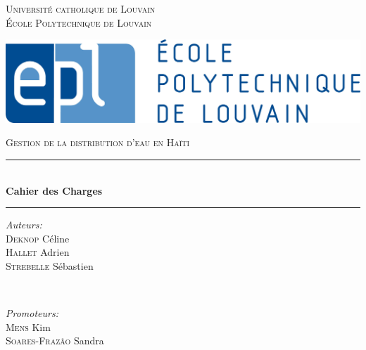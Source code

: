 \documentclass[a4paper, 11pt]{article}
\begin{document}
\begin{titlepage}

\newcommand{\HRule}{\rule{\linewidth}{0.5mm}} %

\center %

\textsc{\LARGE Université catholique de Louvain \\ École Polytechnique de Louvain}

\vfill

\includegraphics[scale=0.45]{Cahier_des_Charges/epl.jpg}

\vfill

\textsc{\large Gestion de la distribution d'eau en Haïti}\\[0.5cm] %


\HRule \\[0.5cm]
{ \huge \bfseries Cahier des Charges}\\[0.3cm] %
\HRule

\vfill


\begin{minipage}[t]{0.4\textwidth}
\begin{flushleft} \large
\emph{Auteurs:}\\
\textsc{Deknop} Céline \\
\textsc{Hallet} Adrien \\
\textsc{Strebelle} Sébastien \\
\end{flushleft}
\end{minipage}
~
\begin{minipage}[t]{0.4\textwidth}
\begin{flushright} \large
\emph{Promoteurs:} \\
\textsc{Mens} Kim \\
 \textsc{Soares-Frazão} Sandra \\%
\end{flushright}
\end{minipage}


\end{titlepage}
\end{document}
